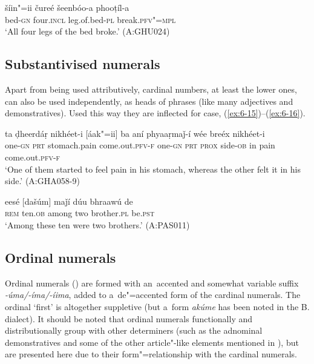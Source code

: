 {\begin{exe}
\ex
\label{ex:6-14}
\gll šíin"=ii čureé šeenbóo-a phooṭíl-a \\
bed-\textsc{gn} four.\textsc{incl} leg.of.bed-\textsc{pl} break.\textsc{pfv"=mpl} \\
\glt `All four legs of the bed broke.' (A:GHU024)
\end{exe}

\subsection{Substantivised numerals}
\label{subsec:6-4-2}


Apart from being used attributively, cardinal numbers, at least the lower ones, can also be used independently, as heads of  phrases (like many adjectives and demonstratives). Used this way they are inflected for case, (\ref{ex:6-15})--(\ref{ex:6-16}).

\begin{exe}
\ex
\label{ex:6-15}
\gll [áak"=ii] ta ḍheerdáṛ nikhéet-i [áak"=ii] ba  aní phyaaṛmaǰ-í wée
breéx nikhéet-i \\
one-\textsc{gn} \textsc{prt} stomach.pain come.out.\textsc{pfv-f} one-\textsc{gn} \textsc{prt} \textsc{prox} side-\textsc{ob} in pain come.out.\textsc{pfv-f} \\
\glt `One of them started to feel pain in his stomach, whereas the other felt it in his side.'
(A:GHA058-9)

\ex
\label{ex:6-16}
\gll eesé [dašúm] maǰí dúu bhraawú de  \\
\textsc{rem} ten.\textsc{ob} among two brother.\textsc{pl} be.\textsc{pst}  \\
\glt `Among these ten were two brothers.' (A:PAS011)
\end{exe}

\subsection{Ordinal numerals}
\label{subsec:6-4-3}

Ordinal numerals () are formed with an~accented and somewhat variable suffix \textit{-úma/-íma/-íima}, added to a~de"=accented form of the cardinal numerals. The ordinal `first' is altogether suppletive (but a~form \textit{akúme} has been noted in the B. dialect). It should be noted that ordinal numerals functionally and distributionally group with other determiners (such as the adnominal demonstratives and some of the other article"-like elements mentioned in ), but are presented here due to their form"=relationship with the cardinal numerals.


}
